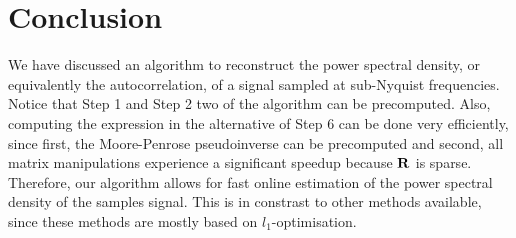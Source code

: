 \documentclass[a4paper, openany, oneside]{memoir}
\begin{document}
\section{Conclusion}
We have discussed an algorithm to reconstruct the power spectral density, or equivalently the autocorrelation, of a signal sampled at sub-Nyquist frequencies. Notice that Step 1 and Step 2 two of the algorithm can be precomputed. Also, computing the expression in the alternative of Step 6 can be done very efficiently, since first, the Moore-Penrose pseudoinverse can be precomputed and second, all matrix manipulations experience a significant speedup because $\boldsymbol{\mathbf{R}}$ is sparse. Therefore, our algorithm allows for fast online estimation of the power spectral density of the samples signal. This is in constrast to other methods available, since these methods are mostly based on $l_1$-optimisation. 
\end{document}
